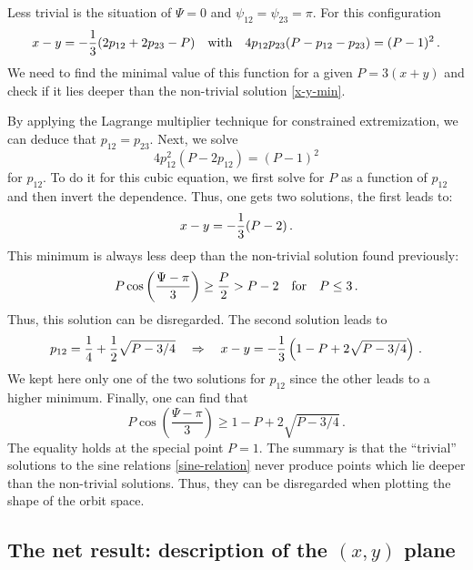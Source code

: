\documentclass[11pt]{article}
\begin{document}
Less trivial is the situation of $\Psi = 0$ and $\psi_{12}=\psi_{23} = \pi$.
For this configuration
\begin{equation}
x-y = -{1\over 3}(2p_{12}+2p_{23} - P)\quad\mbox{with}\quad 4p_{12}p_{23}(P-p_{12}-p_{23}) = (P-1)^2\,.
\end{equation}
We need to find the minimal value of this function for a given $P = 3(x+y)$ and
check if it lies deeper than the non-trivial solution \eqref{x-y-min}.

By applying the Lagrange multiplier technique for constrained extremization, 
we can deduce that $p_{12} = p_{23}$.
Next, we solve 
\begin{equation}
4 p_{12}^2(P-2p_{12}) = (P-1)^2
\end{equation} 
for $p_{12}$. To do it for this cubic equation, we first solve for $P$ as a function of $p_{12}$
and then invert the dependence. Thus, one gets two solutions, the first leads to:
\begin{equation}
x-y = -{1\over 3}(P-2)\,.
\end{equation}
This minimum is always less deep than the non-trivial solution found previously:
\begin{equation}
P\cos\left(\frac{\Psi - \pi}{3}\right) \ge {P\over 2} > P-2 \quad \mbox{for}\quad P\le 3\,.
\end{equation}
Thus, this solution can be disregarded. The second solution leads to
\begin{equation}
p_{12} = {1\over 4} + {1\over 2}\sqrt{P - 3/4} \quad \Rightarrow \quad
x-y = -{1\over 3}\left(1 - P + 2\sqrt{P - 3/4}\right)\,.
\end{equation}
We kept here only one of the two solutions for $p_{12}$ since the other leads to a higher minimum. 
Finally, one can find that
\begin{equation}
P\cos\left(\frac{\Psi - \pi}{3}\right) \ge 1 - P + 2\sqrt{P - 3/4}\,. 
\end{equation}
The equality holds at the special point $P = 1$. 
The summary is that the ``trivial'' solutions to the sine relations \eqref{sine-relation}
never produce points which lie deeper than the non-trivial solutions.
Thus, they can be disregarded when plotting the shape of the orbit space.


\subsection{The net result: description of the $(x,y)$ plane}\label{appendix:S4.result}
\end{document}

